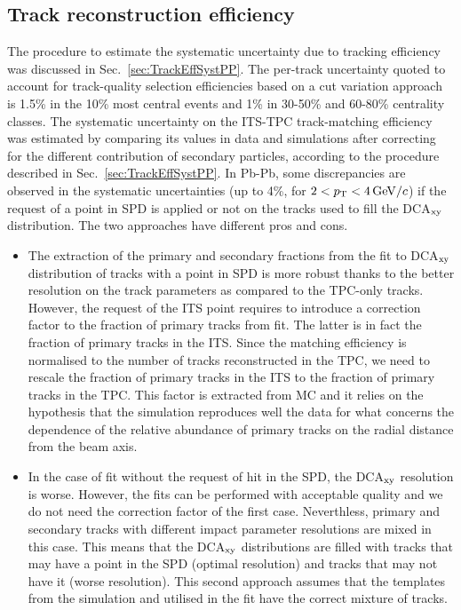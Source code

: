 \subsection{Track reconstruction efficiency}
\label{sec:TrackEffSystPbPb}
The procedure to estimate the systematic uncertainty due to
 tracking efficiency was discussed in Sec.~\ref{sec:TrackEffSystPP}.
The per-track uncertainty quoted to account for track-quality selection efficiencies
based on a cut variation approach is 1.5\% in the 10\% most central events and 1\% in 30-50\% and 60-80\% 
centrality classes. The systematic uncertainty on the ITS-TPC 
track-matching efficiency was estimated by comparing its values in data and simulations
after correcting for the different contribution of secondary particles, according to
the procedure described in Sec.~\ref{sec:TrackEffSystPP}.
In Pb-Pb, some discrepancies are observed in the systematic uncertainties (up to 4\%, for $2 < p_{\rm T} < 4\, \mathrm{GeV}/c$)
if the request of a point in SPD is applied or not on the tracks used to fill the DCA$_{\rm xy}$ distribution.
The two approaches have different pros and cons.
\begin{itemize}
\item The extraction of the primary and secondary fractions from the fit to DCA$_{\rm xy}$ distribution of
tracks with a point in SPD is more robust thanks to the better resolution on the track 
parameters as compared to the TPC-only tracks. However, the request of
the ITS point requires to introduce a correction factor to the fraction of primary tracks from fit. The latter is in fact
the fraction of primary tracks in the ITS. Since the matching efficiency
is normalised to the number of tracks reconstructed in the TPC, we need to 
rescale the fraction of primary tracks in the ITS to the fraction of primary tracks in the TPC. This factor is extracted from MC and it
relies on the hypothesis that the simulation reproduces well the data for what concerns
the dependence of the relative abundance of primary tracks on the radial distance from the beam axis.
\item In the case of fit without the request of hit in the SPD, the DCA$_{\rm xy}$
resolution is worse. However, the fits can be performed with acceptable quality and we do not
need the correction factor of the first case.
Neverthless, primary and secondary tracks with different impact parameter resolutions are mixed in this case. 
This means that the DCA$_{\rm xy}$ distributions are filled with tracks that may have a point in the SPD (optimal resolution)
and tracks that may not have it (worse resolution). This second approach assumes that the templates from the simulation and
utilised in the fit have the correct mixture of tracks.
\end{itemize}
